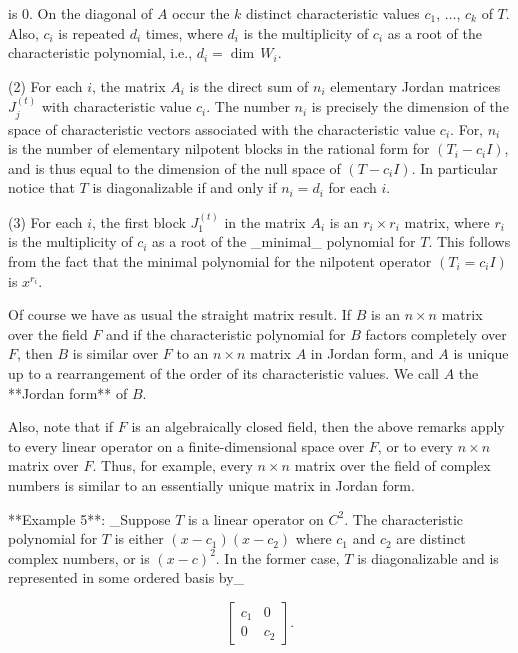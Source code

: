 is 0. On the diagonal of \(A\) occur the \(k\) distinct characteristic values \(c_{1}\), \(\ldots\), \(c_{k}\) of \(T\). Also, \(c_{i}\) is repeated \(d_{i}\) times, where \(d_{i}\) is the multiplicity of \(c_{i}\) as a root of the characteristic polynomial, i.e., \(d_{i}=\dim\,W_{i}\).

(2) For each \(i\), the matrix \(A_{i}\) is the direct sum of \(n_{i}\) elementary Jordan matrices \(J_{j}^{(t)}\) with characteristic value \(c_{i}\). The number \(n_{i}\) is precisely the dimension of the space of characteristic vectors associated with the characteristic value \(c_{i}\). For, \(n_{i}\) is the number of elementary nilpotent blocks in the rational form for \((T_{i}-c_{i}I)\), and is thus equal to the dimension of the null space of \((T-c_{i}I)\). In particular notice that \(T\) is diagonalizable if and only if \(n_{i}=d_{i}\) for each \(i\).

(3) For each \(i\), the first block \(J_{1}^{(t)}\) in the matrix \(A_{i}\) is an \(r_{i}\times r_{i}\) matrix, where \(r_{i}\) is the multiplicity of \(c_{i}\) as a root of the _minimal_ polynomial for \(T\). This follows from the fact that the minimal polynomial for the nilpotent operator \((T_{i}=c_{i}I)\) is \(x^{r_{i}}\).

Of course we have as usual the straight matrix result. If \(B\) is an \(n\times n\) matrix over the field \(F\) and if the characteristic polynomial for \(B\) factors completely over \(F\), then \(B\) is similar over \(F\) to an \(n\times n\) matrix \(A\) in Jordan form, and \(A\) is unique up to a rearrangement of the order of its characteristic values. We call \(A\) the **Jordan form** of \(B\).

Also, note that if \(F\) is an algebraically closed field, then the above remarks apply to every linear operator on a finite-dimensional space over \(F\), or to every \(n\times n\) matrix over \(F\). Thus, for example, every \(n\times n\) matrix over the field of complex numbers is similar to an essentially unique matrix in Jordan form.

**Example 5**: _Suppose \(T\) is a linear operator on \(C^{2}\). The characteristic polynomial for \(T\) is either \((x-c_{1})(x-c_{2})\) where \(c_{1}\) and \(c_{2}\) are distinct complex numbers, or is \((x-c)^{2}\). In the former case, \(T\) is diagonalizable and is represented in some ordered basis by_

\[\begin{bmatrix}c_{1}&0\\ 0&c_{2}\end{bmatrix}.\]

